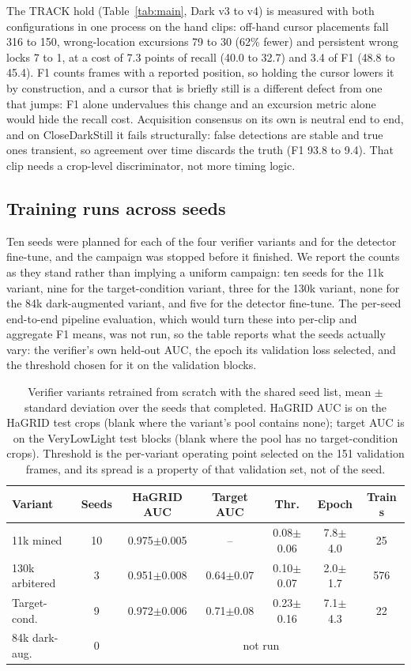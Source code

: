\documentclass[conference,a4paper]{IEEEtran}
\begin{document}
The TRACK hold (Table~\ref{tab:main}, Dark v3 to v4) is measured with both
configurations in one process on the hand clips: off-hand cursor placements
fall 316 to 150, wrong-location excursions 79 to 30 (62\% fewer) and
persistent wrong locks 7 to 1, at a cost of 7.3 points of recall (40.0 to
32.7) and 3.4 of F1 (48.8 to 45.4). F1 counts frames with a reported
position, so holding the cursor lowers it by construction, and a cursor
that is briefly still is a different defect from one that jumps: F1 alone
undervalues this change and an excursion metric alone would hide the recall
cost. Acquisition consensus on its own is neutral end to end, and on
CloseDarkStill it fails structurally: false detections are stable and true
ones transient, so agreement over time discards the truth (F1 93.8 to 9.4).
That clip needs a crop-level discriminator, not more timing logic.

\subsection{Training runs across seeds}
\label{sec:seeds}

Ten seeds were planned for each of the four verifier variants and for the
detector fine-tune, and the campaign was stopped before it finished. We
report the counts as they stand rather than implying a uniform campaign:
ten seeds for the 11k variant, nine for the target-condition variant, three
for the 130k variant, none for the 84k dark-augmented variant, and five for
the detector fine-tune. The per-seed end-to-end pipeline evaluation, which
would turn these into per-clip and aggregate F1 means, was not run, so the
table reports what the seeds actually vary: the verifier's own held-out
AUC, the epoch its validation loss selected, and the threshold chosen for
it on the validation blocks.

\begin{table}[t]
\caption{Verifier variants retrained from scratch with the shared seed
list, mean $\pm$ standard deviation over the seeds that completed. HaGRID
AUC is on the HaGRID test crops (blank where the variant's pool contains
none); target AUC is on the VeryLowLight test blocks (blank where the pool
has no target-condition crops). Threshold is the per-variant operating
point selected on the 151 validation frames, and its spread is a property
of that validation set, not of the seed.}
\label{tab:seeds}
\centering
\footnotesize
\setlength{\tabcolsep}{3pt}
\begin{tabular}{@{}lcccccc@{}}
\toprule
Variant & Seeds & HaGRID AUC & Target AUC & Thr. & Epoch & Train s \\
\midrule
11k mined         & 10 & 0.975$\pm$0.005 & -- & 0.08$\pm$0.06 & 7.8$\pm$4.0 & 25 \\
130k arbitered    &  3 & 0.951$\pm$0.008 & 0.64$\pm$0.07 & 0.10$\pm$0.07 & 2.0$\pm$1.7 & 576 \\
Target-cond.      &  9 & 0.972$\pm$0.006 & 0.71$\pm$0.08 & 0.23$\pm$0.16 & 7.1$\pm$4.3 & 22 \\
84k dark-aug.     &  0 & \multicolumn{5}{c}{not run} \\
\bottomrule
\end{tabular}
\end{table}
\end{document}

